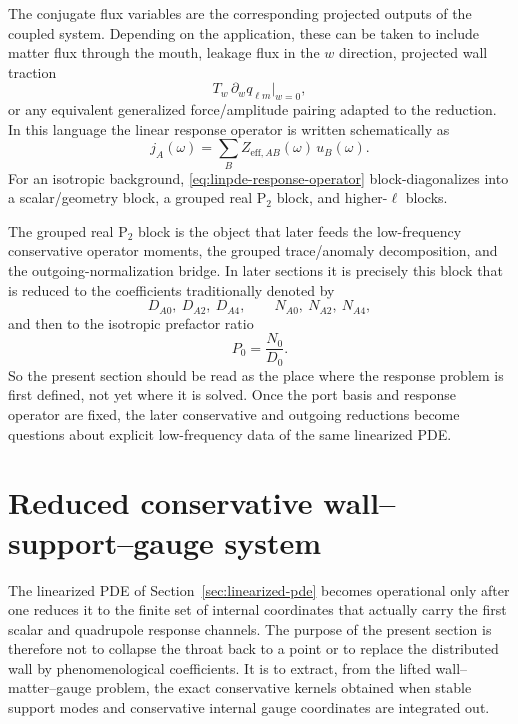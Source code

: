 \documentclass[11pt]{article}
\theoremstyle{definition}
\newcommand{\Ptwo}{\ensuremath{\mathrm{P}_2}}
\newcommand{\eff}{\mathrm{eff}}
\begin{document}
The conjugate flux variables are the corresponding projected outputs of the coupled system. Depending on the application, these can be taken to include matter flux through the mouth, leakage flux in the $w$ direction, projected wall traction
\[
T_w\,\partial_w q_{\ell m}\big|_{w=0},
\]
or any equivalent generalized force/amplitude pairing adapted to the reduction. In this language the linear response operator is written schematically as
\begin{equation}
j_A(\omega)=\sum_B Z_{\eff,AB}(\omega)\,u_B(\omega).
\label{eq:linpde-response-operator}
\end{equation}
For an isotropic background, \eqref{eq:linpde-response-operator} block-diagonalizes into a scalar/geometry block, a grouped real $\Ptwo$ block, and higher-$\ell$ blocks.

The grouped real $\Ptwo$ block is the object that later feeds the low-frequency conservative operator moments, the grouped trace/anomaly decomposition, and the outgoing-normalization bridge. In later sections it is precisely this block that is reduced to the coefficients traditionally denoted by
\[
D_{A0},\ D_{A2},\ D_{A4},
\qquad
N_{A0},\ N_{A2},\ N_{A4},
\]
and then to the isotropic prefactor ratio
\[
P_0=\frac{N_0}{D_0}.
\]
So the present section should be read as the place where the response problem is first defined, not yet where it is solved. Once the port basis and response operator are fixed, the later conservative and outgoing reductions become questions about explicit low-frequency data of the same linearized PDE.

\section{Reduced conservative wall--support--gauge system}
\label{sec:reduced-system}

The linearized PDE of Section~\ref{sec:linearized-pde} becomes operational only after one reduces it to the finite set of internal coordinates that actually carry the first scalar and quadrupole response channels. The purpose of the present section is therefore not to collapse the throat back to a point or to replace the distributed wall by phenomenological coefficients. It is to extract, from the lifted wall--matter--gauge problem, the exact conservative kernels obtained when stable support modes and conservative internal gauge coordinates are integrated out.
\end{document}
